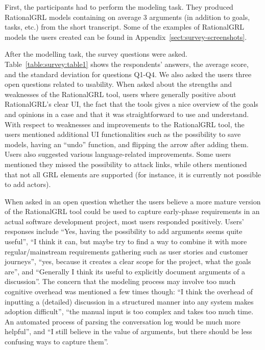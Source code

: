 First, the participants had to perform the modeling task. They produced RationalGRL models containing on average 3 arguments (in addition  to goals, tasks, etc.) from the short transcript. Some of the examples of RationalGRL models the users created can be found in Appendix~\ref{sect:survey-screenshots}.

After the modelling task, the survey questions were asked. Table~\ref{table:survey:table1} shows the respondents' answers, the average score, and the standard deviation for questions Q1-Q4. 
We also asked the users three open questions related to usability. When asked about the strengths and weaknesses of the RationalGRL tool, users where generally positive about RationalGRL's clear UI, the fact that the tools gives a nice overview of the goals and opinions in a case and that it was straightforward to use and understand. With respect to weaknesses and improvements to the RationalGRL tool, the users mentioned additional UI functionalities such as the possibility to save models, having an ``undo'' function, and flipping the arrow after adding them. Users also suggested various language-related improvements. Some users mentioned they missed the possibility to attack links, while others mentioned that not all GRL elements are supported (for instance, it is currently not possible to add actors).

When asked in an open question whether the users believe a more mature version of the RationalGRL tool could be used to capture early-phase requirements in an actual software development project, most users responded positively. Users' responses include ``Yes, having the possibility to add arguments seems quite useful'', ``I think it can, but maybe try to find a way to combine it with more regular/mainstream requirements gathering such as user stories and customer journeys'', ``yes, because it creates a clear scope for the project, what the goals are'', and ``Generally I think its useful to explicitly document arguments of a discussion''. The concern that the modeling process may involve too much cognitive overhead was mentioned a few times though: ``I think the overhead of inputting a (detailed) discussion in a structured manner into any system makes adoption difficult'', ``the manual input is too complex and takes too much time. An automated process of parsing the conversation log would be much more helpful'', and ``I still believe in the value of arguments, but there should be less confusing ways to capture them''.

